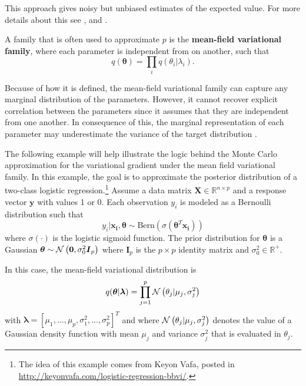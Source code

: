 This approach gives noisy but unbiased estimates of the expected value. For more details about this see \cite{kucukelbir2017automatic}, \cite{ranganath2017black} and \cite{ranganath2014black}.

A family that is often used to approximate $p$ is the \textbf{mean-field variational family}, where each parameter is independent from on another, such that
\begin{equation}
  q(\boldsymbol{\theta}) = \prod_{i} q(\theta_i | \lambda_i).
\end{equation}

Because of how it is defined, the mean-field variational family can capture any marginal distribution of the parameters. However, it cannot recover explicit correlation between the parameters since it assumes that they are independent from one another. In consequence of this, the marginal representation of each parameter may underestimate the variance of the target distribution \cite{blei2017variational}.

The following example will help illustrate the logic behind the Monte Carlo approximation for the variational gradient under the mean field variational family.
In this example, the goal is to approximate the posterior distribution of a two-class logistic regression.\footnote{The idea of this example comes from Keyon Vafa, posted in \url{http://keyonvafa.com/logistic-regression-bbvi/}.}
Assume a data matrix $\boldsymbol{X} \in \mathbb{R}^{n \times p}$ and a response vector $\boldsymbol{y}$ with values 1 or 0. Each observation $y_i$ is modeled as a Bernoulli distribution such that
\begin{equation}
  y_i | \boldsymbol{x_i}, \boldsymbol{\theta} \sim \mathrm{Bern}(\sigma(\boldsymbol{\theta}^T \boldsymbol{x_i}))
\end{equation}
where $\sigma(\cdot)$ is the logistic sigmoid function. The prior distribution for $\boldsymbol{\theta}$ is a Gaussian $\boldsymbol{\theta} \sim \mathcal{N}\left( \boldsymbol{0}, \sigma_0^2 \boldsymbol{I}_p \right)$ where $\boldsymbol{I}_p$ is the $p \times p$ identity matrix and $\sigma_0^2 \in \mathbb{R}^+$.

In this case, the mean-field variational distribution is
\begin{equation}
  \label{eq:mean_field_normal_prior}
  q(\boldsymbol{\theta} | \boldsymbol{\lambda}) = \prod_{j = 1}^p \mathcal{N}\left( \theta_j | \mu_j, \sigma_j^2 \right)
 \end{equation}
with $\boldsymbol{\lambda} = \left[ \mu_1, \hdots, \mu_p, \sigma_1^2, \hdots, \sigma_p^2 \right]^T$ and where $\mathcal{N}\left( \theta_j | \mu_j, \sigma_j^2 \right)$ denotes the value of a Gaussian density function with mean $\mu_j$ and variance $\sigma_j^2$ that is evaluated in $\theta_j$.

